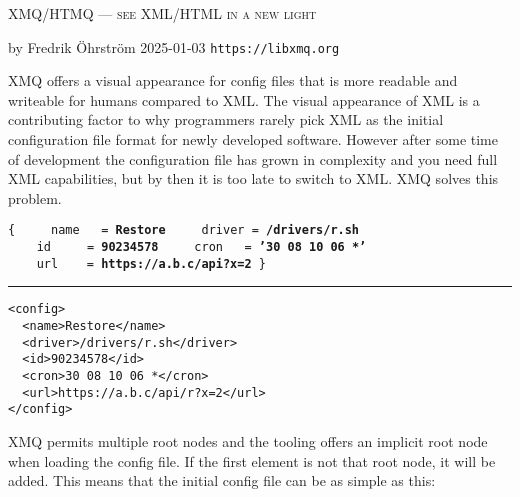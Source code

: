 \documentclass[10pt,a4paper]{article}
\newcommand{\xmqEN}[1]{{\color{xmqEN}#1}}
\newcommand{\xmqEK}[1]{{\color{xmqEK}#1}}
\newcommand{\xmqEKV}[1]{{\color{xmqEKV}\textbf{#1}}}
\newcommand{\xmqI}[0]{{\mbox{\ }}}
\begin{document}
{\flushleft
{\textsc{\Large XMQ/HTMQ --- see XML/HTML in a new light}}

by Fredrik Öhrström 2025-01-03 \hfill \texttt{https://libxmq.org}
}

{\flushleft{\large\textsc{\color{Red}{Rationale}}}} XMQ offers a visual
appearance for config files that is more readable and writeable for humans compared
to XML. The visual appearance of XML is a contributing factor to why programmers
rarely pick XML as the initial configuration file format for newly developed software.
However after some time of development the configuration file has grown in complexity
and you need full XML capabilities, but by then it is too late to switch to XML. XMQ solves this problem.

\begin{minipage}[b][27mm][b]{6cm}
\texttt{\flushleft\noindent \xmqEN{config}\xmqI \{\linebreak
\xmqI \xmqI \xmqI \xmqI \xmqEK{name}\xmqI \xmqI \xmqI =\xmqI \xmqEKV{Restore}\linebreak
\xmqI \xmqI \xmqI \xmqI \xmqEK{driver}\xmqI =\xmqI \xmqEKV{/drivers/r.sh}\linebreak
\xmqI \xmqI \xmqI \xmqI \xmqEK{id}\xmqI \xmqI \xmqI \xmqI \xmqI =\xmqI \xmqEKV{90234578}\linebreak
\xmqI \xmqI \xmqI \xmqI \xmqEK{cron}\xmqI \xmqI \xmqI =\xmqI \xmqEKV{'}\xmqEKV{30 08 10 06 *}\xmqEKV{'}\linebreak
\xmqI \xmqI \xmqI \xmqI \xmqEK{url}\xmqI \xmqI \xmqI \xmqI =\xmqI \xmqEKV{https://a.b.c/api?x=2}\linebreak
\}
}
\end{minipage}
\rule{5mm}{0cm}
\begin{minipage}[b][27mm][b]{6cm}
\verb|<config>|\\
\verb|  <name>Restore</name>|\\
\verb|  <driver>/drivers/r.sh</driver>|\\
\verb|  <id>90234578</id>|\\
\verb|  <cron>30 08 10 06 *</cron>|\\
\verb|  <url>https://a.b.c/api/r?x=2</url>|\\
\verb|</config>|
\end{minipage}

{\flushleft{\large\textsc{\color{Red}{Tooling}}}} XMQ permits multiple root nodes
and the tooling offers an implicit root node when loading the config file. If the
first element is not that root node, it will be added. This means that the initial
config file can be as simple as this:
\end{document}
